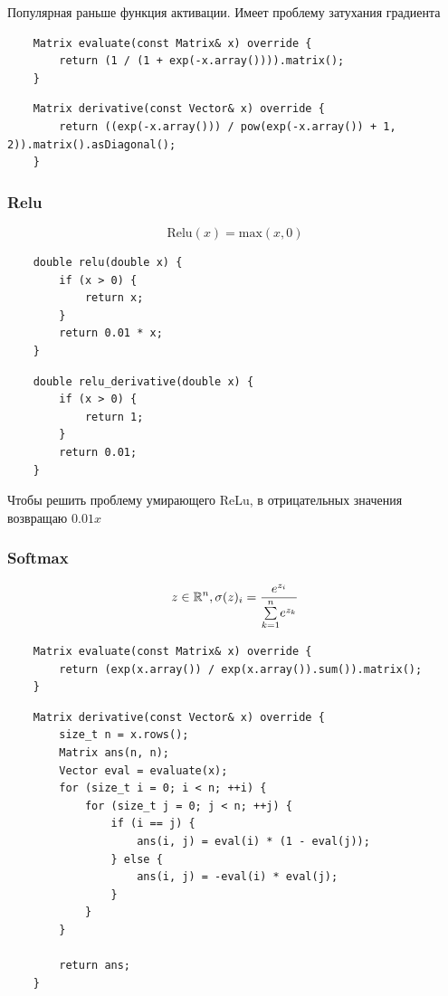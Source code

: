 \documentclass{article}
\begin{document}
Популярная раньше функция активации. Имеет проблему затухания градиента
\begin{lstlisting}
    Matrix evaluate(const Matrix& x) override {
        return (1 / (1 + exp(-x.array()))).matrix();
    }
\end{lstlisting}

\begin{lstlisting}
    Matrix derivative(const Vector& x) override {
        return ((exp(-x.array())) / pow(exp(-x.array()) + 1, 2)).matrix().asDiagonal();
    }
\end{lstlisting}

\subsubsection{Relu}
$$
\text{Relu}(x) = \text{max}(x, 0)
$$

\begin{lstlisting}
    double relu(double x) {
        if (x > 0) {
            return x;
        }
        return 0.01 * x;
    }
\end{lstlisting}

\begin{lstlisting}
    double relu_derivative(double x) {
        if (x > 0) {
            return 1;
        }
        return 0.01;
    }
\end{lstlisting}

Чтобы решить проблему умирающего ReLu, в отрицательных значения возвращаю $0.01x$

\subsubsection{Softmax}

$$
z \in \R^n, \sigma(z)_i = \frac{e^{z_i}}{\Sum{k = 1}{n}e^{z_k}}
$$

\begin{lstlisting}
    Matrix evaluate(const Matrix& x) override {
        return (exp(x.array()) / exp(x.array()).sum()).matrix();
    }
\end{lstlisting}

\begin{lstlisting}
    Matrix derivative(const Vector& x) override {
        size_t n = x.rows();
        Matrix ans(n, n);
        Vector eval = evaluate(x);
        for (size_t i = 0; i < n; ++i) {
            for (size_t j = 0; j < n; ++j) {
                if (i == j) {
                    ans(i, j) = eval(i) * (1 - eval(j));
                } else {
                    ans(i, j) = -eval(i) * eval(j);
                }
            }
        }

        return ans;
    }
\end{lstlisting}
\end{document}
